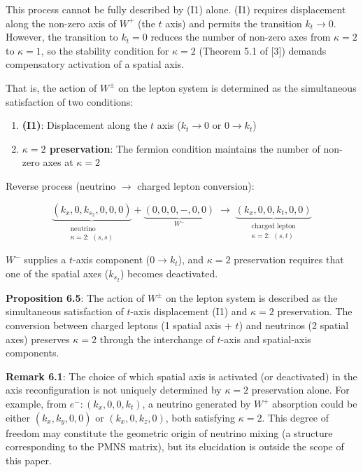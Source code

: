 \documentclass[
  a4paper,11pt]{article}
\providecommand{\tightlist}{%
  \setlength{\itemsep}{0pt}\setlength{\parskip}{0pt}}
\theoremstyle{definition}
\theoremstyle{remark}
\begin{document}
This process cannot be fully described by (I1) alone. (I1) requires
displacement along the non-zero axis of \(W^+\) (the \(t\) axis) and
permits the transition \(k_t \to 0\). However, the transition to
\(k_t = 0\) reduces the number of non-zero axes from \(\kappa = 2\) to
\(\kappa = 1\), so the stability condition for \(\kappa = 2\) (Theorem
5.1 of {[}3{]}) demands compensatory activation of a spatial axis.

That is, the action of \(W^{\pm}\) on the lepton system is determined as
the simultaneous satisfaction of two conditions:

\begin{enumerate}
\def\labelenumi{\arabic{enumi}.}
\tightlist
\item
  \textbf{(I1)}: Displacement along the \(t\) axis (\(k_t \to 0\) or
  \(0 \to k_t\))
\item
  \textbf{\(\kappa = 2\) preservation}: The fermion condition maintains
  the number of non-zero axes at \(\kappa = 2\)
\end{enumerate}

Reverse process (neutrino \(\to\) charged lepton conversion):

\[\underbrace{(k_x, 0, k_{s_2}, 0, 0, 0)}_{\substack{\text{neutrino} \\ \kappa = 2:\; (s, s)}} + \underbrace{(0, 0, 0, -, 0, 0)}_{W^-} \;\longrightarrow\; \underbrace{(k_x, 0, 0, k_t, 0, 0)}_{\substack{\text{charged lepton} \\ \kappa = 2:\; (s, t)}}\]

\(W^-\) supplies a \(t\)-axis component (\(0 \to k_t\)), and
\(\kappa = 2\) preservation requires that one of the spatial axes
(\(k_{s_2}\)) becomes deactivated.

\textbf{Proposition 6.5}: The action of \(W^{\pm}\) on the lepton system
is described as the simultaneous satisfaction of \(t\)-axis displacement
(I1) and \(\kappa = 2\) preservation. The conversion between charged
leptons (1 spatial axis + \(t\)) and neutrinos (2 spatial axes)
preserves \(\kappa = 2\) through the interchange of \(t\)-axis and
spatial-axis components.

\textbf{Remark 6.1}: The choice of which spatial axis is activated (or
deactivated) in the axis reconfiguration is not uniquely determined by
\(\kappa = 2\) preservation alone. For example, from
\(e^-: (k_x, 0, 0, k_t)\), a neutrino generated by \(W^+\) absorption
could be either \((k_x, k_y, 0, 0)\) or \((k_x, 0, k_z, 0)\), both
satisfying \(\kappa = 2\). This degree of freedom may constitute the
geometric origin of neutrino mixing (a structure corresponding to the
PMNS matrix), but its elucidation is outside the scope of this paper.
\end{document}

